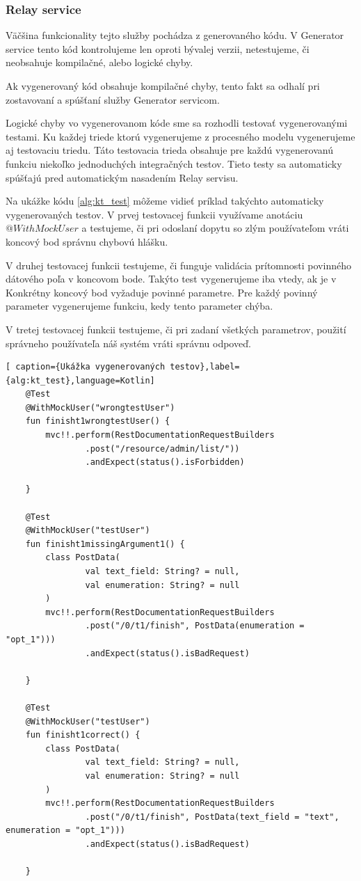 \subsubsection{Relay service}
Väčšina funkcionality tejto služby pochádza z generovaného kódu. V Generator service tento kód kontrolujeme len oproti bývalej verzii, netestujeme, či neobsahuje kompilačné, alebo logické chyby. 

Ak vygenerovaný kód obsahuje kompilačné chyby, tento fakt sa odhalí pri zostavovaní a spúšťaní služby Generator servicom. 

Logické chyby vo vygenerovanom kóde sme sa rozhodli testovať vygenerovanými testami. Ku každej triede ktorú vygenerujeme z procesného modelu vygenerujeme aj testovaciu triedu. Táto testovacia trieda obsahuje  pre každú vygenerovanú funkciu niekoľko jednoduchých integračných testov.  
Tieto testy sa automaticky spúšťajú pred automatickým nasadením Relay servisu. 

Na ukážke kódu \ref{alg:kt_test} môžeme vidieť príklad takýchto automaticky vygenerovaných testov. V prvej testovacej funkcii využívame anotáciu $@WithMockUser$ a testujeme, či pri odoslaní dopytu so zlým používateľom vráti koncový bod správnu chybovú hlášku.

V druhej testovacej funkcii testujeme, či funguje validácia prítomnosti povinného dátového poľa v koncovom bode. Takýto test vygenerujeme iba vtedy, ak je v Konkrétny koncový bod vyžaduje povinné parametre. Pre každý povinný parameter vygenerujeme funkciu, kedy tento parameter chýba. 

V tretej testovacej funkcii testujeme, či pri zadaní všetkých parametrov, použití správneho používateľa náš systém vráti správnu odpoveď.

\begin{lstlisting}[ caption={Ukážka vygenerovaných testov},label={alg:kt_test},language=Kotlin]
    @Test
    @WithMockUser("wrongtestUser")
    fun finisht1wrongtestUser() {
        mvc!!.perform(RestDocumentationRequestBuilders
                .post("/resource/admin/list/"))
                .andExpect(status().isForbidden)

    }

    @Test
    @WithMockUser("testUser")
    fun finisht1missingArgument1() {
        class PostData(
                val text_field: String? = null,
                val enumeration: String? = null
        )
        mvc!!.perform(RestDocumentationRequestBuilders
                .post("/0/t1/finish", PostData(enumeration = "opt_1")))
                .andExpect(status().isBadRequest)

    }

    @Test
    @WithMockUser("testUser")
    fun finisht1correct() {
        class PostData(
                val text_field: String? = null,
                val enumeration: String? = null
        )
        mvc!!.perform(RestDocumentationRequestBuilders
                .post("/0/t1/finish", PostData(text_field = "text", enumeration = "opt_1")))
                .andExpect(status().isBadRequest)

    }
\end{lstlisting}


